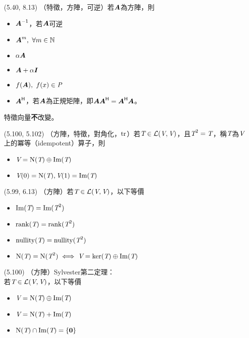 \item \begin{theorem}{(5.40, 8.13)} （特徵，方陣，可逆）若$\mat{A}$為方陣，則
	\begin{itemize}
		\item $\mat{A}\inv$，若$\mat{A}$可逆
		\item $\mat{A}^m, \ \forall m \in \N$
		\item $\alpha\mat{A}$
		\item $\mat{A} + \alpha\mat{I}$
		\item $f(\mat{A}), \ f(x) \in \P$
		\item $\mat{A}\herm$，若$\mat{A}$為正規矩陣，即$\mat{A}\mat{A}\herm = \mat{A}\herm\mat{A}$。
	\end{itemize}
	特徵向量\textbf{不}改變。
\end{theorem}

\item \begin{theorem}{(5.100, 5.102)} （方陣，特徵，對角化，$\tr$）若$\T \in \L(\V, \V)$，且$\T^2 = \T$，稱$\T$為$\V$上的冪等（idempotent）算子，則
	\begin{itemize}
		\item $\V = \Ker(\T) \oplus \im(\T)$
		\item $\V(0) = \Ker(\T), \V(1) = \im(\T)$
	\end{itemize}
\end{theorem}

\item \begin{theorem}{(5.99, 6.13)} （方陣）若$\T \in \L(\V, \V)$，以下等價
	\begin{itemize}
		\item $\im(\T) = \im(\T^2)$
		\item $\rnk(\T) = \rnk(\T^2)$
		\item $\nul(\T) = \nul(\T^2)$
		\item $\Ker(\T) = \Ker(\T^2) \iff \V = \ker(\T) \oplus \im(\T)$
	\end{itemize}
\end{theorem}

\item \begin{theorem}{(5.100)} （方陣）Sylvester第二定理： \\
	若$\T \in \L(\V, \V)$，以下等價
	\begin{itemize}
		\item $\V = \Ker(\T) \oplus \im(\T)$
		\item $\V = \Ker(\T) + \im(\T)$
		\item $\Ker(\T) \cap \im(\T) = \{\vec{0}\}$
	\end{itemize}
\end{theorem}
